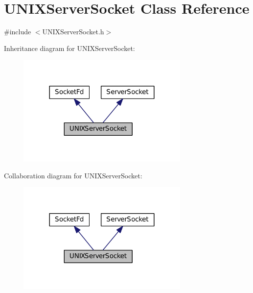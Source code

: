\hypertarget{classUNIXServerSocket}{\section{U\+N\+I\+X\+Server\+Socket Class Reference}
\label{classUNIXServerSocket}
}


{\ttfamily \#include $<$U\+N\+I\+X\+Server\+Socket.\+h$>$}



Inheritance diagram for U\+N\+I\+X\+Server\+Socket\+:
\nopagebreak
\begin{figure}[H]
\begin{center}
\leavevmode
\includegraphics[width=240pt]{classUNIXServerSocket__inherit__graph}
\end{center}
\end{figure}


Collaboration diagram for U\+N\+I\+X\+Server\+Socket\+:
\nopagebreak
\begin{figure}[H]
\begin{center}
\leavevmode
\includegraphics[width=240pt]{classUNIXServerSocket__coll__graph}
\end{center}
\end{figure}
